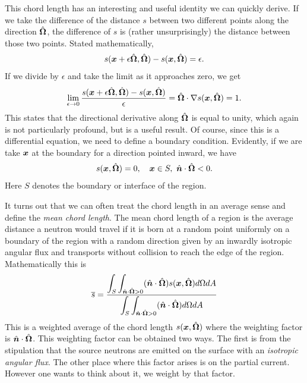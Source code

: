 This chord length has an interesting and useful identity we can quickly derive. If we take the difference of the distance $s$ between two different points along the direction $\hat{\mathbf{\Omega}}$, the difference of $s$ is (rather unsurprisingly) the distance between those two points. Stated mathematically,
\begin{align}
  s(\bm{x} + \epsilon \hat{\mathbf{\Omega}}, \hat{\mathbf{\Omega}} ) - s(\bm{x},\hat{\mathbf{\Omega}}) = \epsilon . \nonumber
\end{align}
If we divide by $\epsilon$ and take the limit as it approaches zero, we get
\begin{align}
  \lim_{\epsilon \rightarrow 0} \frac{ s(\bm{x} + \epsilon \hat{\mathbf{\Omega}}, \hat{\mathbf{\Omega}} ) - s(\bm{x},\hat{\mathbf{\Omega}}) }{ \epsilon } = \hat{\mathbf{\Omega}} \cdot \nabla s(\bm{x},\hat{\mathbf{\Omega}}) = 1. \label{Eq:thermalization_chordLengthDirectionalDerivative}
\end{align}
This states that the directional derivative along $\hat{\mathbf{\Omega}}$ is equal to unity, which again is not particularly profound, but is a useful result. Of course, since this is a differential equation, we need to define a boundary condition. Evidently, if we are take $\bm{x}$ at the boundary for a direction pointed inward, we have
\begin{align}
  s(\bm{x},\hat{\mathbf{\Omega}}) = 0, \quad \bm{x} \in S, \ \hat{\bm{n}} \cdot \hat{\mathbf{\Omega}} < 0. \label{Eq:thermalization_chordLengthDirectionalDerivative_BoundaryCondition}
\end{align}
Here $S$ denotes the boundary or interface of the region.

It turns out that we can often treat the chord length in an average sense and define the \emph{mean chord length}. The mean chord length of a region is the average distance a neutron would travel if it is born at a random point uniformly on a boundary of the region with a random direction given by an inwardly isotropic angular flux and transports without collision to reach the edge of the region. Mathematically this is
\begin{align}
  \overline{s} = \dfrac{  \displaystyle\int_{S} \int_{\hat{\bm{n}} \cdot \hat{\mathbf{\Omega}} > 0} ( \hat{\bm{n}} \cdot \hat{\mathbf{\Omega}} ) s( \bm{x}, \hat{\mathbf{\Omega}} ) d\Omega dA }{ \displaystyle\int_{S} \int_{\hat{\bm{n}} \cdot \hat{\mathbf{\Omega}} > 0} ( \hat{\bm{n}} \cdot \hat{\mathbf{\Omega}} ) d\Omega dA  } \label{Eq:thermalization_meanChordLength_definition}
\end{align}
This is a weighted average of the chord length $s(\bm{x},\hat{\mathbf{\Omega}})$ where the weighting factor is $\hat{\bm{n}} \cdot \hat{\mathbf{\Omega}}$. This weighting factor can be obtained two ways. The first is from the stipulation that the source neutrons are emitted on the surface with an \emph{isotropic angular flux}. The other place where this factor arises is on the partial current. However one wants to think about it, we weight by that factor.

